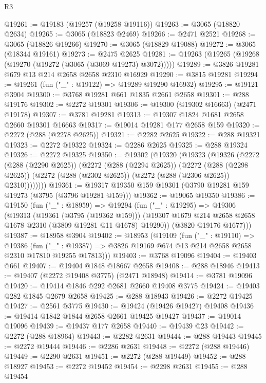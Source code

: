 \begin{lexlean}{R3}
\begin{coremodule}
@19261 := @19183 (@19257 (@19258 @19116))
@19263 := @3065 (@18820 @2634)
@19265 := @3065 (@18823 @2469)
@19266 := @2471 @2521
@19268 := @3065 (@18826 @19266)
@19270 := @3065 (@18829 @19088)
@19272 := @3065 (@18344 @19161)
@19273 := @2475 @2625
@19281 := @19263 (@19265 (@19268 (@19270 (@19272 (@3065 (@3069 @19273) @3072)))))
@19289 := @3826 @19281 @679 @13 @214 @2658 @2658 @2310 @16929
@19290 := @3815 @19281
@19294 := @19261 (fun ("_" : @19122) => @19289 @19290 @16932)
@19295 := @19121 @3904
@19300 := @3768 @19281 @661 @1835 @2661 @2658
@19301 := @288 @19176
@19302 := @2272 @19301
@19306 := @19300 (@19302 @16663) (@2471 @19178)
@19307 := @3781 @19281
@19313 := @19307 @1824 @1681 @2658 @2660 @19301 @16663
@19317 := @19014 @19281 @177 @2658 @159
@19320 := @2272 (@288 (@2278 @2625))
@19321 := @2282 @2625
@19322 := @288 @19321
@19323 := @2272 @19322
@19324 := @2286 @2625
@19325 := @288 @19324
@19326 := @2272 @19325
@19350 := @19302
    (@19320
      (@19323
        (@19326
          (@2272
            (@288 (@2290 @2625))
            (@2272
              (@288 (@2294 @2625))
              (@2272
                (@288 (@2298 @2625))
                (@2272 (@288 (@2302 @2625)) (@2272 (@288 (@2306 @2625)) @2310))))))))
@19361 := @19317 @19350 @159 @19301 (@3790 @19281 @159 @19273 (@3795 (@3796 @19281 @159)))
@19362 := @19065 @19350
@19386 := @19150
    (fun ("_" : @18959) =>
    @19294
      (fun ("_" : @19295) =>
      @19306
        (@19313
          (@19361 (@3795 (@19362 @159)))
          (@19307 @1679 @214 @2658 @2658 @1678 @2310 (@3809 @19281 @11 @1678) @19290))
        (@3820 @19176 @1677)))
@19387 := @18958 @3904
@19402 := @18953
    (@19109
      (fun ("_" : @19110) =>
      @19386
        (fun ("_" : @19387) => @3826 @19169 @674 @13 @214 @2658 @2658 @2310 @17810 @19255 @17813)))
@19403 := @3768 @19096
@19404 := @19403 @661
@19407 := @19404 @1848 @18667 @2658
@19408 := @288 @18946
@19413 := @19407 (@2272 @19408 @3775) (@2471 @18948)
@19414 := @3781 @19096
@19420 := @19414 @1846 @292 @2681 @2660 @19408 @3775
@19424 := @19403 @282 @1845 @2679 @2658
@19425 := @288 @18943
@19426 := @2272 @19425
@19427 := @2561 @3775
@19430 := @19424 (@19426 @19427) @19408
@19436 := @19414 @1842 @1844 @2658 @2661 @19425 @19427
@19437 := @19014 @19096
@19439 := @19437 @177 @2658
@19440 := @19439 @23
@19442 := @2272 (@288 @18964)
@19443 := @2282 @2631
@19444 := @288 @19443
@19445 := @2272 @19444
@19446 := @2286 @2631
@19448 := @2272 (@288 @19446)
@19449 := @2290 @2631
@19451 := @2272 (@288 @19449)
@19452 := @288 @18927
@19453 := @2272 @19452
@19454 := @2298 @2631
@19455 := @288 @19454

\end{coremodule}
\end{lexlean}
